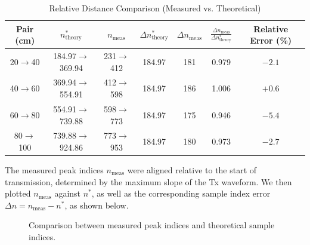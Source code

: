 \documentclass[10pt]{article}
\begin{document}
\begin{table}[h!]
\centering
\caption{Relative Distance Comparison (Measured vs. Theoretical)}
\begin{tabular}{|c|c|c|c|c|c|c|}
\hline
Pair (cm) & $n^*_{\mathrm{theory}}$ & $n_{\mathrm{meas}}$ &
$\Delta n^*_{\mathrm{theory}}$ & $\Delta n_{\mathrm{meas}}$ &
$\frac{\Delta n_{\mathrm{meas}}}{\Delta n^*_{\mathrm{theory}}}$ &
Relative Error (\%) \\
\hline
20$\rightarrow$40 & 184.97$\rightarrow$369.94 & 231$\rightarrow$412 & 184.97 & 181 & 0.979 & $-2.1$ \\
40$\rightarrow$60 & 369.94$\rightarrow$554.91 & 412$\rightarrow$598 & 184.97 & 186 & 1.006 & $+0.6$ \\
60$\rightarrow$80 & 554.91$\rightarrow$739.88 & 598$\rightarrow$773 & 184.97 & 175 & 0.946 & $-5.4$ \\
80$\rightarrow$100 & 739.88$\rightarrow$924.86 & 773$\rightarrow$953 & 184.97 & 180 & 0.973 & $-2.7$ \\
\hline
\end{tabular}
\end{table}

The measured peak indices $n_{\mathrm{meas}}$ were aligned relative to the start of transmission, determined by the maximum slope of the Tx waveform. We then plotted $n_{\mathrm{meas}}$ against $n^*$, as well as the corresponding sample index error $\Delta n = n_{\mathrm{meas}} - n^*$, as shown below.

\begin{figure}[!h]
	\centering
	\caption{Comparison between measured peak indices and theoretical sample indices.}
\label{fig:robust_lin}
\end{figure}
\end{document}
